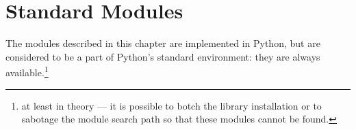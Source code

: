 \chapter{Standard Modules}

The modules described in this chapter are implemented in Python, but
are considered to be a part of Python's standard environment: they are
always available.\footnote{at least in theory --- it is possible to
botch the library installation or to sabotage the module search path
so that these modules cannot be found.}
